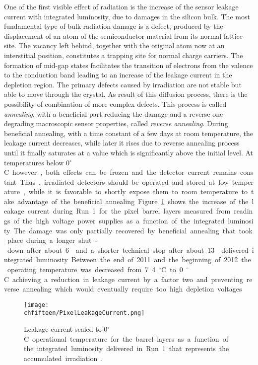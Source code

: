 One of the first visible effect of radiation is the increase of the sensor leakage current with integrated luminosity, due to damages in the silicon bulk.
The most fundamental type of bulk radiation damage is a defect, produced by the displacement of an atom of the semiconductor material from its normal lattice site.
The vacancy left behind, together with the original atom now at an interstitial position, constitutes a trapping site for normal charge carriers.
The formation of mid-gap states facilitates the transition of electrons from the valence to the conduction band leading to an increase of the leakage current in the depletion region.
The primary defects caused by irradiation are not stable but able to move through the crystal. As result of this diffusion process, there is the possibility of combination of more complex defects.
This process is called \textit{annealing}, with a beneficial part reducing the damage and a reverse one degrading macroscopic sensor properties, called \textit{reverse annealing}.
During beneficial annealing, with a time constant of a few days at room temperature, the leakage current decreases, while later it rises due to reverse annealing process until it finally saturates at a value which is significantly above the initial level. At temperatures below 0\unit{$^\circ$C} however, both effects can be frozen and the detector current remains constant.
Thus, irradiated detectors should be operated and stored at low temperature, while it is favorable to shortly expose them to room temperature to take advantage of the beneficial annealing.

Figure~\ref{fig:PixLeakageCurrent} shows the increase of the leakage current during Run~1 for the pixel barrel layers measured from readings of the high voltage power supplies as a function of the integrated luminosity.
The damage was only partially recovered by beneficial annealing that took place during a longer shut-down after about 6\fbinv and a shorter technical stop after about 13\fbinv delivered integrated luminosity.
Between the end of 2011 and the beginning of 2012 the operating temperature was decreased from 7.4\unit{$^\circ$C} to 0\unit{$^\circ$C} achieving a reduction in leakage current by a factor two and preventing reverse annealing which would eventually require too high depletion voltages.\\

\begin{figure}[!htb]
 \begin{center}
 \texttt{[image: \\chfifteen/PixelLeakageCurrent.png]}
 \end{center}
 \caption{Leakage current scaled to 0\unit{$^\circ$C} operational temperature for the barrel layers as a function of the integrated luminosity delivered in Run~1 that represents the accumulated irradiation~\cite{PixelOffline}.}
 \label{fig:PixLeakageCurrent}
\end{figure}


